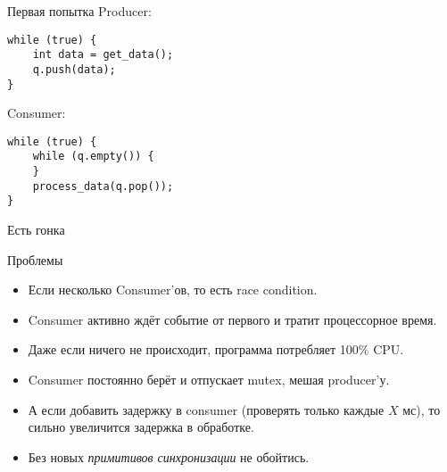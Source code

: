 \begin{frame}[fragile]{Первая попытка}
	Producer:
\begin{verbatim}
while (true) {
    int data = get_data();
    q.push(data);
}
\end{verbatim}
	Consumer:
	\pause
\begin{verbatim}
while (true) {
    while (q.empty()) {
    }
    process_data(q.pop());
}
\end{verbatim}
\end{frame}

\begin{frame}{Есть гонка}
\end{frame}

\begin{frame}{Проблемы}
	\begin{itemize}
		\item Если несколько Consumer'ов, то есть race condition.
		\item Consumer активно ждёт событие от первого и тратит процессорное время.
		\item Даже если ничего не происходит, программа потребляет 100\% CPU.
		\item Consumer постоянно берёт и отпускает mutex, мешая producer'у.
		\pause
		\item
			А если добавить задержку в consumer (проверять только каждые $X$ мс),
			то сильно увеличится задержка в обработке.
		\item Без новых \textit{примитивов синхронизации} не обойтись.
	\end{itemize}
\end{frame}

